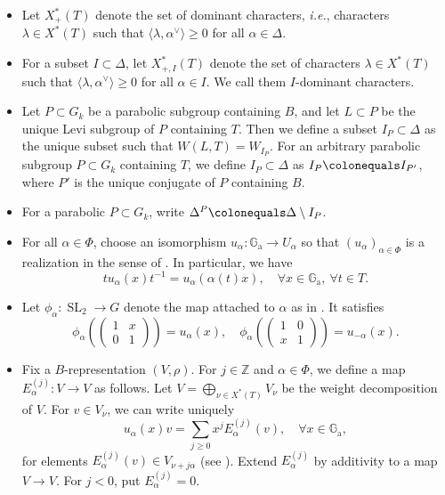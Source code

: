 \documentclass[10pt,a4paper]{article}
\numberwithin{equation}{section}
\theoremstyle{definition}
\theoremstyle{remark}
\newcommand{\GG}{\mathbb{G}}
\newcommand{\ZZ}{\mathbb{Z}}
\DeclareMathOperator{\SL}{SL}
\begin{document}
\begin{itemize}
\item Let $X_{+}^*(T)$ denote the set of dominant characters, \textit{i.e.}, characters $\lambda\in X^*(T)$ such that $\langle \lambda,\alpha^\vee \rangle \geq 0$ for all $\alpha \in \Delta$.
\item For a subset $I\subset \Delta$, let $X_{+,I}^*(T)$ denote the set of characters $\lambda\in X^*(T)$ such that $\langle \lambda,\alpha^\vee \rangle \geq 0$ for all $\alpha \in I$. We call them $I$-dominant characters.
\item Let $P\subset G_k$ be a parabolic subgroup containing $B$, and let $L\subset P$ be the unique Levi subgroup of $P$ containing $T$. Then we define a subset $I_P\subset \Delta$ as the unique subset such that $W(L,T)=W_{I_P}$. For an arbitrary parabolic subgroup $P\subset G_k$ containing $T$, we define $I_P\subset \Delta$ as $I_P \colonequals I_{P'}$, where $P'$ is the unique conjugate of $P$ containing $B$.
\item For a parabolic $P\subset G_k$, write $\Delta^P \colonequals \Delta \setminus I_P$.
\item For all $\alpha\in \Phi$, choose an isomorphism $u_\alpha\colon \GG_{\mathrm{a}}\to U_\alpha$ so that 
  $(u_{\alpha})_{\alpha \in \Phi}$ is a realization in the sense of \cite[Section~8.1.4]{Springer-Linear-Algebraic-Groups-book}.
  In particular, we have 
\begin{equation}\label{eq:phiconj}
 t u_{\alpha}(x)t^{-1}=u_{\alpha}(\alpha(t)x), \quad \forall x\in \GG_{\mathrm{a}},\  \forall t\in T.
\end{equation}
\item Let $\phi_{\alpha}\colon \SL_2\to G$ denote the map attached to $\alpha$ as in \cite[Proof of Lemma~9.2.2]{Springer-Linear-Algebraic-Groups-book}.
  It satisfies
\[
 \phi_\alpha 
 \left( \begin{pmatrix}
 1 & x \\ 0 & 1 
 \end{pmatrix}\right) = u_{\alpha}(x), \quad 
 \phi_\alpha 
 \left( \begin{pmatrix}
 1 & 0 \\ x & 1 
 \end{pmatrix}\right) = u_{-\alpha}(x).
\]
\item Fix a $B$-representation $(V,\rho)$. For $j\in \ZZ$ and $\alpha\in \Phi$, we define a map $E_{\alpha}^{(j)} \colon V \to V$ as follows. Let $V=\bigoplus_{\nu \in X^*(T)}V_\nu$ be the weight decomposition of $V$. For $v\in V_\nu$, we can write uniquely
\[
 u_{\alpha}(x)v=\sum_{j \geq 0} x^j E_{\alpha}^{(j)}(v), \quad \forall x\in \GG_{\mathrm{a}},
\]
for elements $E_{\alpha}^{(j)}(v) \in V_{\nu+j\alpha}$ (see \cite[Lemma 3.3.1]{Imai-Koskivirta-vector-bundles}). Extend $E_{\alpha}^{(j)}$ by additivity to a map $V\to V$. For $j<0$, put $E_{\alpha}^{(j)}=0$. 
\end{itemize}
\end{document}
